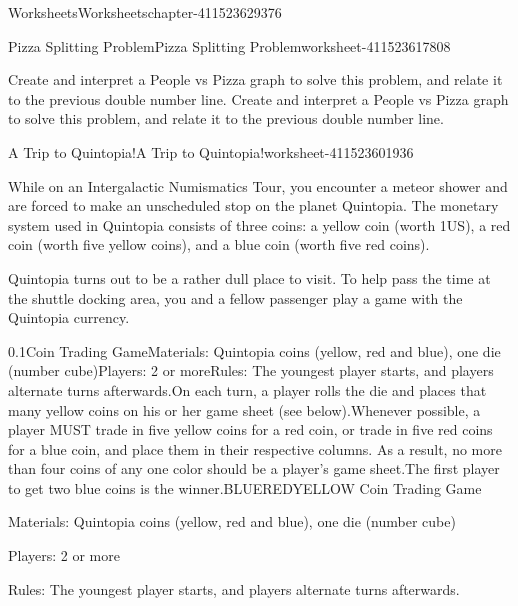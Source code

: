 \documentclass[twoside,11pt,]{book}
\begin{document}
\begin{chapterptx}{Worksheets}{}{Worksheets}{}{}{chapter-411523629376}
\begin{worksheet-section-numberless}{Pizza Splitting Problem}{}{Pizza Splitting Problem}{}{}{worksheet-411523617808}
\begin{divisionexercise}{7}{}{}{
        Create and interpret a People vs Pizza graph to solve this problem, and relate it to the previous double number line.
      }
Create and interpret a People vs Pizza graph to solve this problem, and relate it to the previous double number line.%
\end{divisionexercise}%
\end{worksheet-section-numberless}
\restoregeometry
%
%
\typeout{************************************************}
\typeout{************************************************}
%
\begin{worksheet-section-numberless}{A Trip to Quintopia!}{}{A Trip to Quintopia!}{}{}{worksheet-411523601936}
\begin{introduction}{}%
\hypertarget{p-411523603168}{}%
While on an Intergalactic Numismatics Tour, you encounter a meteor shower and are forced to make an unscheduled stop on the planet Quintopia.  The monetary system used in Quintopia consists of three coins:  a yellow coin (worth \textdollar{}1US), a red coin (worth five yellow coins), and a blue coin (worth five red coins).%
\par
\hypertarget{p-411523602448}{}%
Quintopia turns out to be a rather dull place to visit.  To help pass the time at the shuttle docking area, you and a fellow passenger play a game with the Quintopia currency.%
\end{introduction}%
\begin{divisionexercise}{1}{}{0.1}{Coin Trading GameMaterials:  Quintopia coins (yellow, red and blue), one die (number cube)Players:  2 or moreRules:  The youngest player starts, and players alternate turns afterwards.On each turn, a player rolls the die and places that many yellow coins on his or her game sheet (see below).Whenever possible, a player MUST trade in five yellow coins for a red coin, or trade in five red coins for a blue coin, and place them in their respective columns.  As a result, no more than four coins of any one color should be a player’s game sheet.The first player to get two blue coins is the winner.BLUEREDYELLOW}%
\hypertarget{p-411523570320}{}%
Coin Trading Game%
\par
\hypertarget{p-411523569936}{}%
Materials:  Quintopia coins (yellow, red and blue), one die (number cube)%
\par
\hypertarget{p-411523569552}{}%
Players:  2 or more%
\par
\hypertarget{p-411523569168}{}%
Rules:  The youngest player starts, and players alternate turns afterwards.%
\par
\hypertarget{p-411523568704}{}%

\end{divisionexercise}
\end{worksheet-section-numberless}
\end{chapterptx}
\end{document}
